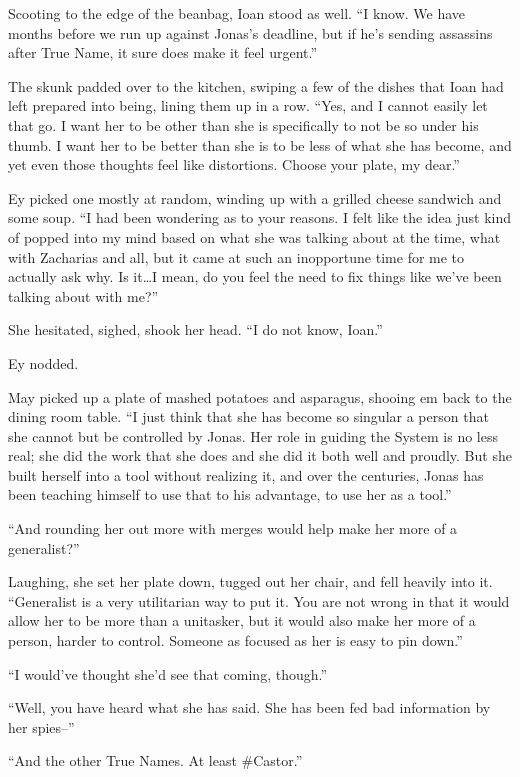 Scooting to the edge of the beanbag, Ioan stood as well. ``I know. We have months before we run up against Jonas's deadline, but if he's sending assassins after True Name, it sure does make it feel urgent.''

The skunk padded over to the kitchen, swiping a few of the dishes that Ioan had left prepared into being, lining them up in a row. ``Yes, and I cannot easily let that go. I want her to be other than she is specifically to not be so under his thumb. I want her to be better than she is to be less of what she has become, and yet even those thoughts feel like distortions. Choose your plate, my dear.''

Ey picked one mostly at random, winding up with a grilled cheese sandwich and some soup. ``I had been wondering as to your reasons. I felt like the idea just kind of popped into my mind based on what she was talking about at the time, what with Zacharias and all, but it came at such an inopportune time for me to actually ask why. Is it\ldots I mean, do you feel the need to fix things like we've been talking about with me?''

She hesitated, sighed, shook her head. ``I do not know, Ioan.''

Ey nodded.

May picked up a plate of mashed potatoes and asparagus, shooing em back to the dining room table. ``I just think that she has become so singular a person that she cannot but be controlled by Jonas. Her role in guiding the System is no less real; she did the work that she does and she did it both well and proudly. But she built herself into a tool without realizing it, and over the centuries, Jonas has been teaching himself to use that to his advantage, to use her as a tool.''

``And rounding her out more with merges would help make her more of a generalist?''

Laughing, she set her plate down, tugged out her chair, and fell heavily into it. ``Generalist is a very utilitarian way to put it. You are not wrong in that it would allow her to be more than a unitasker, but it would also make her more of a person, harder to control. Someone as focused as her is easy to pin down.''

``I would've thought she'd see that coming, though.''

``Well, you have heard what she has said. She has been fed bad information by her spies--''

``And the other True Names. At least \#Castor.''

